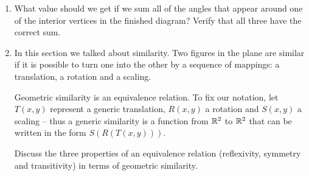 \begin{enumerate}
\item What value should we get if we sum all of the
angles that appear around one of the interior vertices in the 
finished diagram?  Verify that all three have the correct sum.

\begin{center}

\end{center}

\item In this section we talked about similarity.  Two figures in 
the plane are 
similar if it is possible to turn one into the other
by a sequence of mappings: a translation, a rotation and a scaling.  

Geometric similarity is an equivalence relation.  To fix our
notation, let $T(x,y)$ represent a generic translation, $R(x,y)$ a rotation
and $S(x,y)$ a scaling -- thus a generic similarity is a function from
${\mathbb R}^2$ to ${\mathbb R}^2$ that can be written in the form $S(R(T(x,y)))$.

Discuss the three properties of an equivalence relation (reflexivity, symmetry and transitivity) in terms of geometric similarity.

\end{enumerate}



